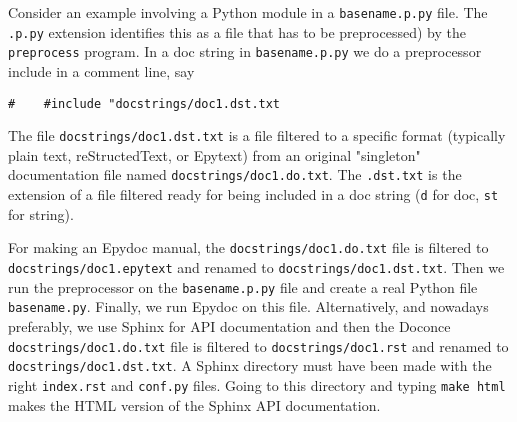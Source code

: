\documentclass{article}
\begin{document}
Consider an example involving a Python module in a {\fontsize{10pt}{10pt}\verb!basename.p.py!} file.
The {\fontsize{10pt}{10pt}\verb!.p.py!} extension identifies this as a file that has to be
preprocessed) by the {\fontsize{10pt}{10pt}\verb!preprocess!} program. 
In a doc string in {\fontsize{10pt}{10pt}\verb!basename.p.py!} we do a preprocessor include
in a comment line, say
\begin{Verbatim}[fontsize=\fontsize{9pt}{9pt},tabsize=8,baselinestretch=0.85,
fontfamily=tt,xleftmargin=7mm]
#    #include "docstrings/doc1.dst.txt
\end{Verbatim}
\noindent
% 
% 
The file {\fontsize{10pt}{10pt}\verb!docstrings/doc1.dst.txt!} is a file filtered to a specific format
(typically plain text, reStructedText, or Epytext) from an original
"singleton" documentation file named {\fontsize{10pt}{10pt}\verb!docstrings/doc1.do.txt!}. The {\fontsize{10pt}{10pt}\verb!.dst.txt!}
is the extension of a file filtered ready for being included in a doc
string ({\fontsize{10pt}{10pt}\verb!d!} for doc, {\fontsize{10pt}{10pt}\verb!st!} for string).

For making an Epydoc manual, the {\fontsize{10pt}{10pt}\verb!docstrings/doc1.do.txt!} file is
filtered to {\fontsize{10pt}{10pt}\verb!docstrings/doc1.epytext!} and renamed to
{\fontsize{10pt}{10pt}\verb!docstrings/doc1.dst.txt!}.  Then we run the preprocessor on the
{\fontsize{10pt}{10pt}\verb!basename.p.py!} file and create a real Python file
{\fontsize{10pt}{10pt}\verb!basename.py!}. Finally, we run Epydoc on this file. Alternatively, and
nowadays preferably, we use Sphinx for API documentation and then the
Doconce {\fontsize{10pt}{10pt}\verb!docstrings/doc1.do.txt!} file is filtered to
{\fontsize{10pt}{10pt}\verb!docstrings/doc1.rst!} and renamed to {\fontsize{10pt}{10pt}\verb!docstrings/doc1.dst.txt!}. A
Sphinx directory must have been made with the right {\fontsize{10pt}{10pt}\verb!index.rst!} and
{\fontsize{10pt}{10pt}\verb!conf.py!} files. Going to this directory and typing {\fontsize{10pt}{10pt}\verb!make html!} makes
the HTML version of the Sphinx API documentation.
\end{document}
